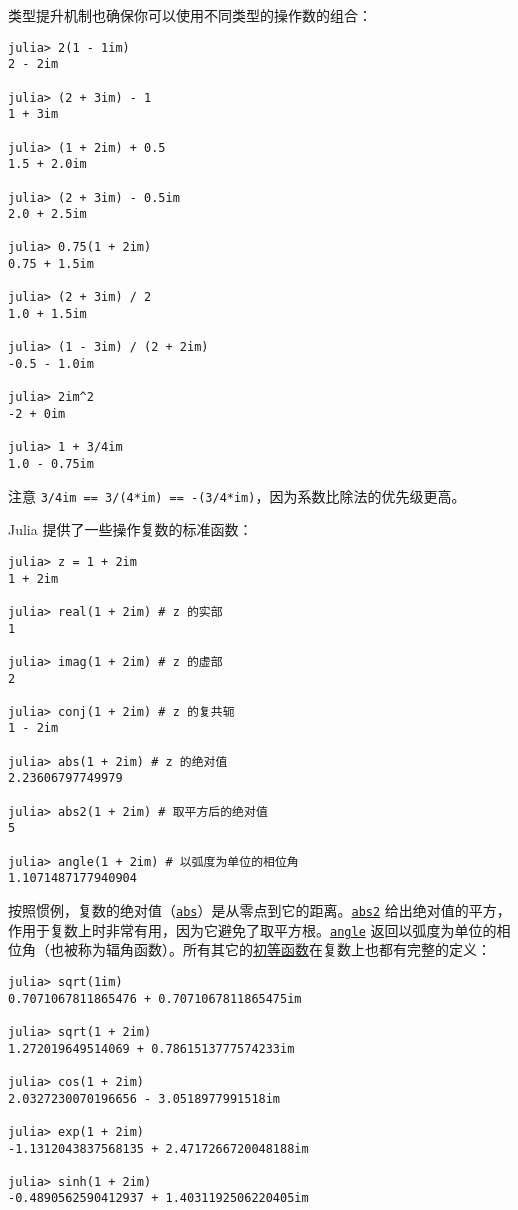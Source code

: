 类型提升机制也确保你可以使用不同类型的操作数的组合：




\begin{verbatim}
julia> 2(1 - 1im)
2 - 2im

julia> (2 + 3im) - 1
1 + 3im

julia> (1 + 2im) + 0.5
1.5 + 2.0im

julia> (2 + 3im) - 0.5im
2.0 + 2.5im

julia> 0.75(1 + 2im)
0.75 + 1.5im

julia> (2 + 3im) / 2
1.0 + 1.5im

julia> (1 - 3im) / (2 + 2im)
-0.5 - 1.0im

julia> 2im^2
-2 + 0im

julia> 1 + 3/4im
1.0 - 0.75im
\end{verbatim}



注意 \texttt{3/4im == 3/(4*im) == -(3/4*im)}，因为系数比除法的优先级更高。



Julia 提供了一些操作复数的标准函数：




\begin{verbatim}
julia> z = 1 + 2im
1 + 2im

julia> real(1 + 2im) # z 的实部
1

julia> imag(1 + 2im) # z 的虚部
2

julia> conj(1 + 2im) # z 的复共轭
1 - 2im

julia> abs(1 + 2im) # z 的绝对值
2.23606797749979

julia> abs2(1 + 2im) # 取平方后的绝对值
5

julia> angle(1 + 2im) # 以弧度为单位的相位角
1.1071487177940904
\end{verbatim}



按照惯例，复数的绝对值（\hyperlink{9614495866226399167}{\texttt{abs}}）是从零点到它的距离。\hyperlink{15686257922156163743}{\texttt{abs2}} 给出绝对值的平方，作用于复数上时非常有用，因为它避免了取平方根。\hyperlink{9465547375318501186}{\texttt{angle}} 返回以弧度为单位的相位角（也被称为辐角函数）。所有其它的\hyperlink{7194628046456539104}{初等函数}在复数上也都有完整的定义：




\begin{verbatim}
julia> sqrt(1im)
0.7071067811865476 + 0.7071067811865475im

julia> sqrt(1 + 2im)
1.272019649514069 + 0.7861513777574233im

julia> cos(1 + 2im)
2.0327230070196656 - 3.0518977991518im

julia> exp(1 + 2im)
-1.1312043837568135 + 2.4717266720048188im

julia> sinh(1 + 2im)
-0.4890562590412937 + 1.4031192506220405im
\end{verbatim}




